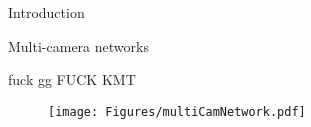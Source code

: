 \begin{frame}{Introduction}
\begin{itemize}
	\myItem Multi-camera networks
	\begin{itemize}
		\mySubItem fuck
		\mySubItem gg
		\mySubItem FUCK KMT
	\end{itemize}
\end{itemize}
\begin{figure}
\centering
\texttt{[image: Figures/multiCamNetwork.pdf]}
\end{figure}
\end{frame}
